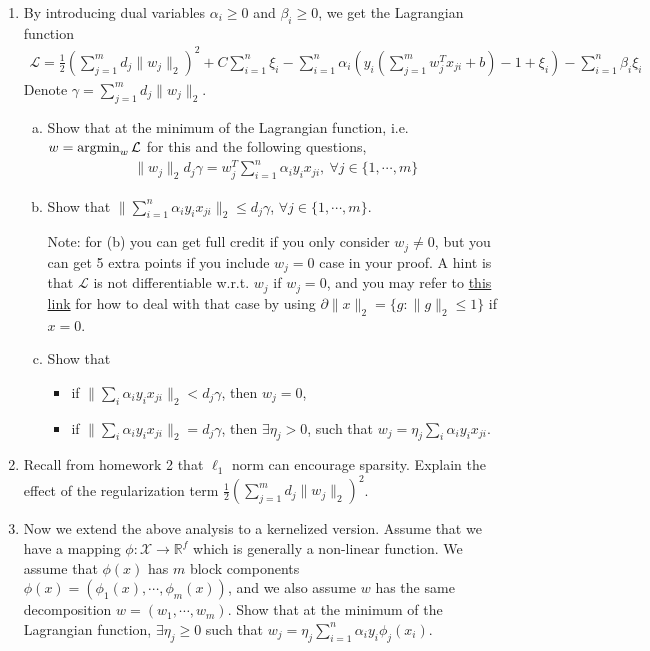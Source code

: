 \begin{enumerate}
\item By introducing dual variables $\alpha_i\ge 0$ and $\beta_i\ge 0$, we get the Lagrangian function
\begin{align}
\mathcal{L} = \frac{1}{2} (\sum_{j=1}^m d_j\|w_j\|_2)^2 + C\sum_{i=1}^n\xi_i - \sum_{i=1}^n \alpha_i (y_i(\sum_{j=1}^m w_j^Tx_{ji}+b)-1+\xi_i) - \sum_{i=1}^n\beta_i\xi_i
\end{align}
Denote $\gamma = \sum_{j=1}^m d_j \|w_j\|_2$.
\begin{enumerate}[(a)]
\item Show that at the {\color{red}minimum} of the Lagrangian function, {\color{red}i.e. $w = \operatorname*{argmin}_w \mathcal{L}$ for this and the following questions},
\begin{align}
\|w_j\|_2 d_j \gamma = w_j^T \sum_{i=1}^n \alpha_i y_i x_{ji}, \ \forall j\in\{1,\cdots,m\}
\end{align}
\item Show that $\|\sum_{i=1}^n \alpha_i y_i x_{ji}\|_2\le d_j \gamma$, $\forall j\in\{1,\cdots,m\}$.

{\color{red}Note: for (b) you can get full credit if you only consider $w_j\neq 0$, but you can get 5 extra points if you include $w_j=0$ case in your proof. A hint is that $\mathcal{L}$ is not differentiable w.r.t. $w_j$ if $w_j=0$, and you may refer to \href{http://www.eecs.berkeley.edu/~wainwrig/ee227a/ee227a_subgradient_lecture.pdf}{this link} for how to deal with that case by using $\partial \|x\|_2 = \{g:\|g\|_2\le 1\}$ if $x=0$.}
\item Show that
\begin{itemize}
\item if $\|\sum_i \alpha_i y_i x_{ji}\|_2< d_j \gamma$, then $w_j=0$,
\item if $\|\sum_i \alpha_i y_i x_{ji}\|_2= d_j \gamma$, then $\exists \eta_j>0$, such that $w_j = \eta_j \sum_i \alpha_i y_i x_{ji}$.
\end{itemize}
\end{enumerate}
\item Recall from homework 2 that $ \ell_1 $ norm can encourage sparsity. Explain the effect of the regularization term $\frac{1}{2}(\sum_{j=1}^m d_j \|w_j\|_2)^2$.
\item Now we extend the above analysis to a kernelized version. Assume that we have a mapping $\phi:\mathcal{X}\to\mathbb{R}^f$ which is generally a non-linear function. We assume that $\phi(x)$ has $m$ block components $\phi(x)=(\phi_1(x),\cdots,\phi_m(x))${\color{red}, and we also assume $w$ has the same decomposition $w=(w_1,\cdots,w_m)$}. Show that at the {\color{red}minimum} of the Lagrangian function, $\exists\eta_j\ge0$ such that $w_j=\eta_j \sum_{i=1}^n\alpha_iy_i\phi_j(x_i)$.
\end{enumerate}
